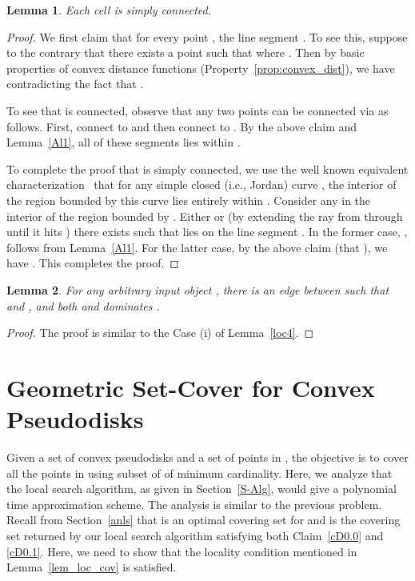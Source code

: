 \documentclass[a4paper,11pt]{article}
\newtheorem{lemma}{Lemma}
\begin{document}
 
 \begin{lemma}\label{Al2}
 Each cell    is simply connected.
 \end{lemma}

\begin{proof}
We first claim that for every point , the line segment . To see this, suppose to the contrary that there exists a point   such that  where . Then by basic
properties of convex distance functions (Property~\ref{prop:convex_dist}), we have
  contradicting the fact that . 



To see that  is connected, observe that any two points  can be connected via   as follows. 
First, connect  to   and then connect  to . 
 By the above claim and Lemma~\ref{Al1}, all of these segments lies within .

To complete the proof that  is simply connected, we use the well known equivalent characterization~\cite{KleinW88} that for any simple closed (i.e., Jordan) curve , the interior of the region bounded by this curve lies entirely within . 
Consider any  in the interior of the region bounded by . 
Either  or (by extending the ray from  through  until it hits ) there exists  such that  lies on the line segment . In the former case, , follows from Lemma~\ref{Al1}. For the latter case, by the above claim (that ), we have  . This completes the proof.
\end{proof}


\begin{lemma}\label{Aloc4}
  For any arbitrary input object , there is an edge 
between 
 such that  and , and both 
 and  dominates . 
 \end{lemma}
 \begin{proof}
The proof is similar to the Case (i) of Lemma~\ref{loc4}.
\end{proof}




 \section{Geometric Set-Cover for Convex Pseudodisks}\label{setCover}
 
 Given a set   of  convex  pseudodisks and a set  of points in , the objective is to cover all the points in  using subset of  of minimum cardinality.
Here, we analyze that the local search algorithm, as given in Section~\ref{S-Alg}, would give a polynomial time approximation scheme. 
The analysis is similar to the previous problem. 
Recall from Section~\ref{anls} that    is an optimal covering set for  and  
is  the covering set returned by our local search algorithm satisfying both  Claim~\ref{cD0.0} and \ref{cD0.1}. 
Here, we need to show that the locality condition mentioned in 
Lemma~\ref{lem_loc_cov}  is satisfied.
\end{document}
